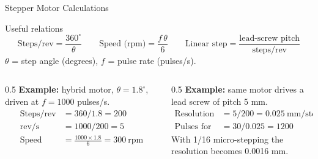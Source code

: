 \documentclass[aspectratio=169]{beamer}
\begin{document}
	\begin{frame}{Stepper Motor Calculations}
		\begin{block}{Useful relations}
			\[
			\text{Steps/rev} = \frac{360^\circ}{\theta}
			\qquad
			\text{Speed (rpm)} = \frac{f\,\theta}{6}
			\qquad
			\text{Linear step} = \frac{\text{lead-screw pitch}}{\text{steps/rev}}
			\]
			$\theta$ = step angle (degrees), $f$ = pulse rate (pulses/s).
		\end{block}
		\begin{columns}[T]
			\begin{column}{0.5\textwidth}
				\textbf{Example:} hybrid motor, $\theta = 1.8^\circ$, driven at $f = 1000$ pulses/s.
				\small
				\begin{align*}
					\text{Steps/rev} &= 360/1.8 = 200\\
					\text{rev/s} &= 1000/200 = 5\\
					\text{Speed} &= \tfrac{1000\times1.8}{6} = \boxed{300\ \text{rpm}}
				\end{align*}
			\end{column}
			\begin{column}{0.5\textwidth}
				\textbf{Example:} same motor drives a lead screw of pitch 5 mm.
				\small
				\begin{align*}
					\text{Resolution} &= 5/200 = \boxed{0.025\ \text{mm/step}}\\
					\text{Pulses for 30 mm} &= 30/0.025 = 1200
				\end{align*}
				\footnotesize With 1/16 micro-stepping the resolution becomes 0.0016 mm.
			\end{column}
		\end{columns}
	\end{frame}
\end{document}
